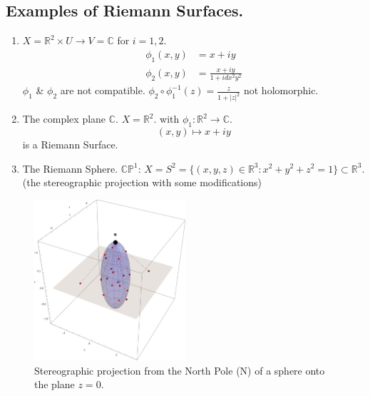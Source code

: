 \documentclass{article}
\begin{document}
\subsection{Examples of Riemann Surfaces.}

\begin{example}
\begin{enumerate}
    The first example is a \textbf{Non-Examples:} 
    \item $X = \mathbb{R}^2 \times U \to V = \mathbb{C}$ for $i=1, 2$.
    \begin{align*}
        \phi_1 (x, y) &= x + iy \\
        \phi_2 (x, y) &= \frac{x+iy}{1+i dx^2 y^2}
    \end{align*}
    $\phi_1$ \& $\phi_2$ are not compatible.
    $\phi_2 \circ \phi_1^{-1} (z) = \frac{z}{1+|z|^2}$ not holomorphic.
    \item The complex plane $\mathbb{C}$.
    $X = \mathbb{R}^2$. with $\phi_1 : \mathbb{R}^2 \to \mathbb{C}$.
    \[
    (x, y) \mapsto x+iy
    \]
    is a Riemann Surface.
    \item The Riemann Sphere. $\mathbb{CP}^1$:
    $X = S^2 = \{ (x, y, z) \in \mathbb{R}^3 : x^2 + y^2 + z^2 = 1 \} \subset \mathbb{R}^3$.
    (the stereographic projection with some modifications)
\end{enumerate}
\end{example}

\begin{figure}[!h]
    \centering
    
    \includegraphics[width=0.5\textwidth]{stereograhic_projection.pdf}
    
    \caption{Stereographic projection from the North Pole (N) of a sphere onto the plane $z=0$.}
    
    \label{fig:stereo_proj}
\end{figure}
\end{document}
